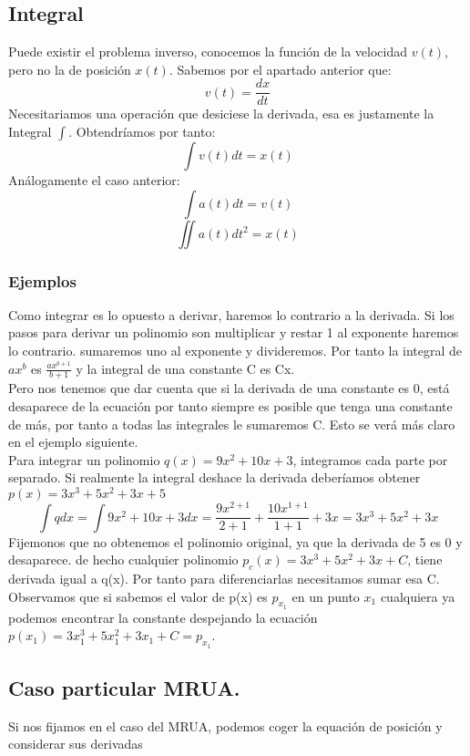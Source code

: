 \documentclass[11pt]{article}
\begin{document}
\subsection{Integral}
\label{sec:orgab67526}
Puede existir el problema inverso, conocemos la función de la velocidad \(v(t)\), pero no la de posición \(x(t)\). Sabemos por el apartado anterior que:
\[
v(t) =  \frac{dx}{dt}
\]
Necesitariamos una operación que desiciese la derivada, esa es justamente la Integral \(\int\). Obtendríamos por tanto:
\[
\int v(t) dt = x(t)
\]
Análogamente el caso anterior:
\[
\int a(t) dt = v(t)
\]
\[
\iint a(t) dt^{2} = x(t)
\]

\subsubsection{Ejemplos}
\label{sec:org84a3773}

Como integrar es lo opuesto a derivar, haremos lo contrario a la derivada.
Si los pasos para derivar un polinomio son multiplicar y restar 1 al exponente haremos lo contrario. sumaremos uno al exponente y divideremos.
Por tanto la integral de \(ax^b\) es \(\frac{ax^{b+1}}{b+1}\) y la integral de una constante C es Cx.\\
Pero nos tenemos que dar cuenta que si la derivada de una constante es 0, está desaparece de la ecuación por tanto siempre es posible que tenga una constante de más, por tanto a todas las integrales le sumaremos C. Esto se verá más claro en el ejemplo siguiente. \\
Para integrar un polinomio \(q(x) = 9x^{2} + 10x + 3\), integramos cada parte por separado. Si realmente la integral deshace la derivada deberíamos obtener  \(p(x) = 3x^{3} + 5x^{2} + 3x + 5\)
   \[
   \int q dx  =  \int 9x^{2} + 10x + 3 dx = \frac{9x^{2+1}}{2+1} + \frac{10x^{1+1}}{1+1} + 3x = 3x^{3} + 5x^{2} + 3x
   \]
   Fijemonos que no obtenemos el polinomio original, ya que la derivada de 5 es 0 y desaparece. de hecho cualquier polinomio \(p_{c}(x) = 3x^{3} + 5x^{2} + 3x + C\), tiene derivada igual a q(x). Por tanto para diferenciarlas necesitamos sumar esa C.\\
   Observamos que si sabemos el valor de p(x) es \(p_{x_1} \) en un punto \( x_1 \) cualquiera ya podemos encontrar la constante despejando la ecuaci\'on \( p(x_1) = 3x_1^{3} + 5x_1^{2} + 3x_1 + C =  p_{x_1} \).


\subsection{Caso particular MRUA.}
\label{sec:org1d9b70e}
Si nos fijamos en el caso del MRUA, podemos coger la equación de posición y considerar sus derivadas
\end{document}
